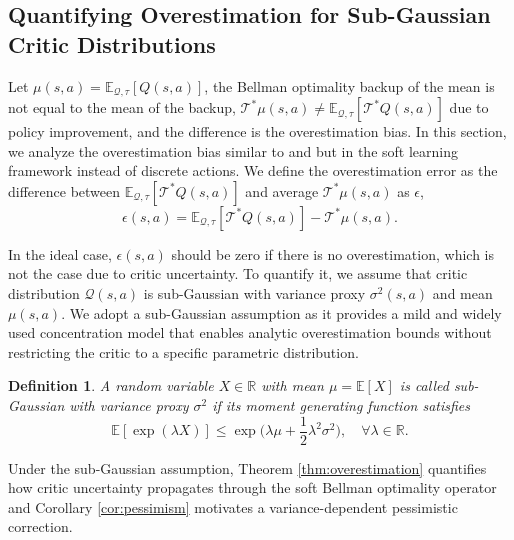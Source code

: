 \documentclass[10pt]{article} %
\newtheorem{definition}{Definition}[section]
\begin{document}
\subsection{Quantifying Overestimation for Sub-Gaussian Critic Distributions}

Let $\mu(s,a) = \mathbb{E}_{\mathcal{Q}, \tau} [ Q(s,a) ]$, the Bellman optimality backup of the mean is not equal to the mean of the backup, $\mathcal{T}^{*} \mu(s,a) \neq \mathbb{E}_{\mathcal{Q}, \tau} [ \mathcal{T}^{*} Q(s,a) ]$ due to policy improvement, and the difference is the overestimation bias. In this section, we analyze the overestimation bias similar to \citet{chen2021randomized} and \citet{lan2020maxmin} but in the soft learning framework instead of discrete actions. We define the overestimation error as the difference between $\mathbb{E}_{\mathcal{Q}, \tau} [ \mathcal{T}^{*} Q(s,a) ]$ and average $\mathcal{T}^{*} \mu(s,a)$ as $\epsilon$, 
\begin{equation}
	\epsilon(s,a) = \mathbb{E}_{\mathcal{Q}, \tau} [ \mathcal{T}^{*} Q(s,a) ] - \mathcal{T}^{*} \mu(s,a). 
\end{equation}

In the ideal case, $\epsilon(s,a)$ should be zero if there is no overestimation, which is not the case due to critic uncertainty. To quantify it, we assume that critic distribution $\mathcal{Q}(s, a)$ is sub-Gaussian with variance proxy $\sigma^2(s,a)$ and mean $\mu(s,a)$. We adopt a sub-Gaussian assumption as it provides a mild and widely used concentration model that enables analytic overestimation bounds without restricting the critic to a specific parametric distribution.

\begin{definition}
	\label{defn:subgauss}
	A random variable $X \in \mathbb{R}$ with mean $\mu=\mathbb{E}[X]$ is called sub-Gaussian with variance proxy $\sigma^2$ if its moment generating function satisfies
	\begin{equation}
		\mathbb{E}[\exp(\lambda X)] \leq \exp \big( \lambda \mu + \frac{1}{2} \lambda^2 \sigma^2 \big), \quad \forall \lambda \in \mathbb{R}. 
	\end{equation}
\end{definition}

Under the sub-Gaussian assumption, Theorem \ref{thm:overestimation} quantifies how critic uncertainty propagates through the soft Bellman optimality operator and Corollary \ref{cor:pessimism} motivates a variance-dependent pessimistic correction.
\end{document}
